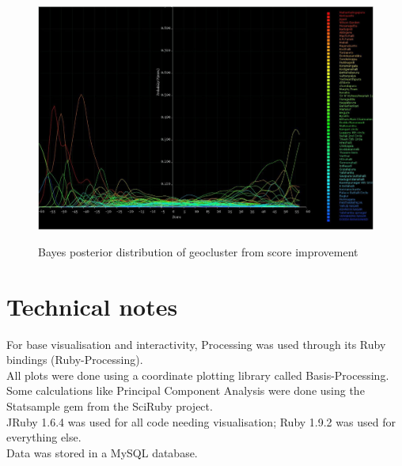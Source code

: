 \documentclass[10pt]{article}
\begin{document}
\begin{figure}
\caption{Bayes posterior distribution of geocluster from score improvement}
\label{BayesClusterFromImprovement}
\begin{center}
\includegraphics[width=160mm]{ReportMedia/BayesClusterFromImprovement.jpg}\\
\end{center}
\end{figure}
\newpage
\section{Technical notes}
For base visualisation and interactivity, Processing was used through its Ruby bindings (Ruby-Processing).\\
All plots were done using a coordinate plotting library called Basis-Processing.\\
Some calculations like Principal Component Analysis were done using the Statsample gem from the SciRuby project.\\
JRuby 1.6.4 was used for all code needing visualisation; Ruby 1.9.2 was used for everything else.\\
Data was stored in a MySQL database.
\end{document}
